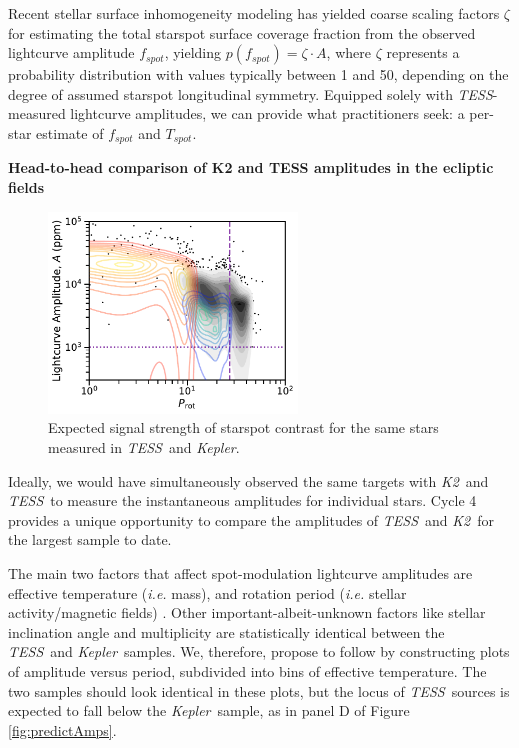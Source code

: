 \documentclass[letterpaper,12pt]{article}
\newcommand{\tess}{{\it TESS}}
\newcommand{\kepler}{{\it Kepler}}
\newcommand{\ktwo}{{\it K2}}
\begin{document}
Recent stellar surface inhomogeneity modeling \cite{2018ApJ...853..122R, 2018ApJ...868..143G, 2018ApJ...865..142B} has yielded coarse scaling factors $\zeta$ for estimating the total starspot surface coverage fraction from the observed lightcurve amplitude $f_{spot}$, yielding $ p(f_{spot}) = \zeta \cdot A $, where $\zeta$ represents a probability distribution with values typically between 1 and 50, depending on the degree of assumed starspot longitudinal symmetry.  Equipped solely with \tess-measured lightcurve amplitudes, we can provide what practitioners seek: a per-star estimate of $f_{spot}$ and $T_{spot}$.

\textbf{Head-to-head comparison of K2 and TESS amplitudes in the ecliptic fields}

\begin{figure}
    \vspace{0mm}
    \begin{center}
    \includegraphics[width=2.6in]{figures/fig1.pdf}
    \caption{Expected signal strength of starspot contrast for the same stars measured in \tess\ and \kepler. }
    \label{fig:expected}
    \vspace{0mm}
\end{center}
\end{figure}


Ideally, we would have simultaneously observed the same targets with \ktwo\ and \tess\ to measure the instantaneous amplitudes for individual stars.  Cycle 4 provides a unique opportunity to compare the amplitudes of \tess\ and \ktwo\ for the largest sample to date.

The main two factors that affect spot-modulation lightcurve amplitudes are effective temperature (\emph{i.e.} mass), and rotation period (\emph{i.e.} stellar activity/magnetic fields) \cite{2014ApJS..211...24M}.  Other important-albeit-unknown factors like stellar inclination angle and multiplicity are statistically identical between the \tess\ and \kepler\ samples.  We, therefore, propose to follow \cite{2014ApJS..211...24M} by constructing plots of amplitude versus period, subdivided into bins of effective temperature.  The two samples should look identical in these plots, but the locus of \tess\ sources is expected to fall below the \kepler\ sample, as in panel D of Figure \ref{fig:predictAmps}.
\end{document}
